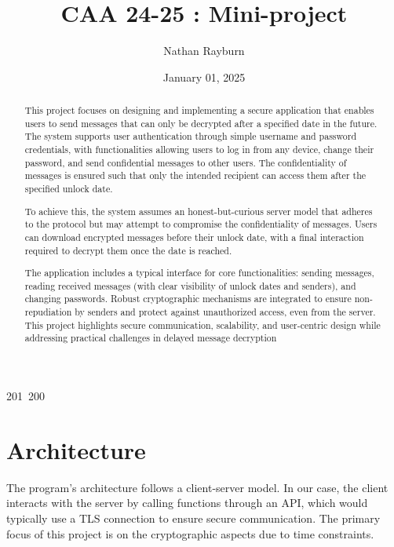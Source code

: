 201~200~\documentclass{article}
\title{CAA 24-25 : Mini-project}
\author{Nathan Rayburn}
\date{January 01, 2025}
\begin{document}
	                                                                \maketitle

	                                                                \begin{abstract}
	                                                                This project focuses on designing and implementing a secure application that enables users to send messages that can only be decrypted after a specified date in the future. The system supports user authentication through simple username and password credentials, with functionalities allowing users to log in from any device, change their password, and send confidential messages to other users. The confidentiality of messages is ensured such that only the intended recipient can access them after the specified unlock date.

	                                                                To achieve this, the system assumes an honest-but-curious server model that adheres to the protocol but may attempt to compromise the confidentiality of messages. Users can download encrypted messages before their unlock date, with a final interaction required to decrypt them once the date is reached.

	                                                                The application includes a typical interface for core functionalities: sending messages, reading received messages (with clear visibility of unlock dates and senders), and changing passwords. Robust cryptographic mechanisms are integrated to ensure non-repudiation by senders and protect against unauthorized access, even from the server. This project highlights secure communication, scalability, and user-centric design while addressing practical challenges in delayed message decryption    
	                                                                \end{abstract}

	                                                                \section{Architecture}
	                                                                The program's architecture follows a client-server model. In our case, the client interacts with the server by calling functions through an API, which would typically use a TLS connection to ensure secure communication. The primary focus of this project is on the cryptographic aspects due to time constraints.
\end{document}
